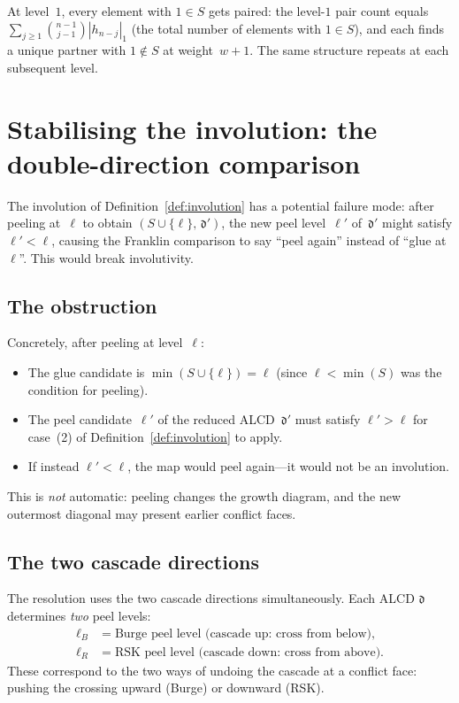 \documentclass[11pt]{article}
\theoremstyle{plain}
\theoremstyle{definition}
\begin{document}
\medskip\noindent
At level~$1$, every element with $1 \in S$ gets paired:
the level-$1$ pair count equals
$\sum_{j \geq 1} \binom{n-1}{j-1} |h_{n-j}|_1$
(the total number of elements with $1 \in S$), and each
finds a unique partner with $1 \notin S$ at weight~$w + 1$.
The same structure repeats at each subsequent level.


\section{Stabilising the involution: the double-direction
  comparison}
\label{sec:double-direction}

The involution of Definition~\ref{def:involution} has a
potential failure mode: after peeling at~$\ell$ to obtain
$(S \cup \{\ell\},\, \mathfrak{d}')$, the new peel
level~$\ell'$ of~$\mathfrak{d}'$ might satisfy
$\ell' < \ell$, causing the Franklin comparison to say
``peel again'' instead of ``glue at~$\ell$''.  This would
break involutivity.

\subsection{The obstruction}

Concretely, after peeling at level~$\ell$:
\begin{itemize}
  \item The glue candidate is $\min(S \cup \{\ell\}) = \ell$
    (since $\ell < \min(S)$ was the condition for peeling).
  \item The peel candidate~$\ell'$ of the reduced
    ALCD~$\mathfrak{d}'$ must satisfy $\ell' > \ell$ for
    case~(2) of Definition~\ref{def:involution} to apply.
  \item If instead $\ell' < \ell$, the map would peel
    again---it would not be an involution.
\end{itemize}

\noindent
This is \emph{not} automatic: peeling changes the growth
diagram, and the new outermost diagonal may present
earlier conflict faces.

\subsection{The two cascade directions}

The resolution uses the two cascade directions
simultaneously.  Each ALCD $\mathfrak{d}$ determines
\emph{two} peel levels:
\begin{align}
  \ell_B &= \text{Burge peel level (cascade up:
    cross from below)}, \label{eq:ell-B} \\
  \ell_R &= \text{RSK peel level (cascade down:
    cross from above)}. \label{eq:ell-R}
\end{align}
These correspond to the two ways of undoing the cascade
at a conflict face: pushing the crossing upward (Burge)
or downward (RSK).
\end{document}

